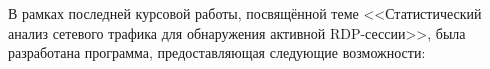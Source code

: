 \documentclass[bachelor, och, coursework]{SCWorks}
\begin{document}





В рамках последней курсовой работы, посвящённой теме <<Статистический анализ сетевого трафика для обнаружения активной RDP-сессии>>, была разработана 
программа, предоставляющая следующие возможности:
\end{document}
